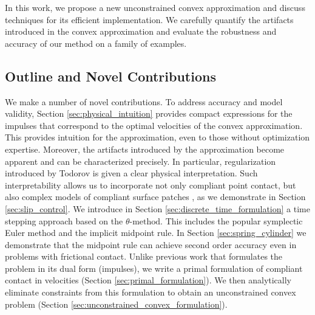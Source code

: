 In this work, we propose a new unconstrained convex approximation and discuss
techniques for its efficient implementation. We carefully quantify the artifacts
introduced in the convex approximation and evaluate the robustness and accuracy
of our method on a family of examples.

\subsection{Outline and Novel Contributions}
We make a number of novel contributions. To address accuracy and model validity,
Section \ref{sec:physical_intuition} provides compact expressions for the
impulses that correspond to the optimal velocities of the convex approximation.
This provides intuition for the approximation, even to those without
optimization expertise. Moreover, the artifacts introduced by the approximation
become apparent and can be characterized precisely. In particular,
regularization introduced by Todorov \cite{bib:todorov2014} is given a clear
physical interpretation. Such interpretability  allows us to incorporate not
only compliant point contact, but also complex models of compliant surface
patches \cite{bib:elandt2019pressure}, as we demonstrate in Section
\ref{sec:slip_control}. We introduce in Section
\ref{sec:discrete_time_formulation} a time stepping approach based on the
$\theta\text{-method}$. This includes the popular symplectic Euler method and
the implicit midpoint rule. In Section \ref{sec:spring_cylinder} we demonstrate
that the midpoint rule can achieve second order accuracy even in problems with
frictional contact. Unlike previous work \cite{bib:anitescu2010,bib:todorov2014}
that formulates the problem in its dual form (impulses), we write a primal
formulation of compliant contact in velocities (Section
\ref{sec:primal_formulation}). We then analytically eliminate constraints from
this formulation to obtain an unconstrained convex problem (Section
\ref{sec:unconstrained_convex_formulation}).


